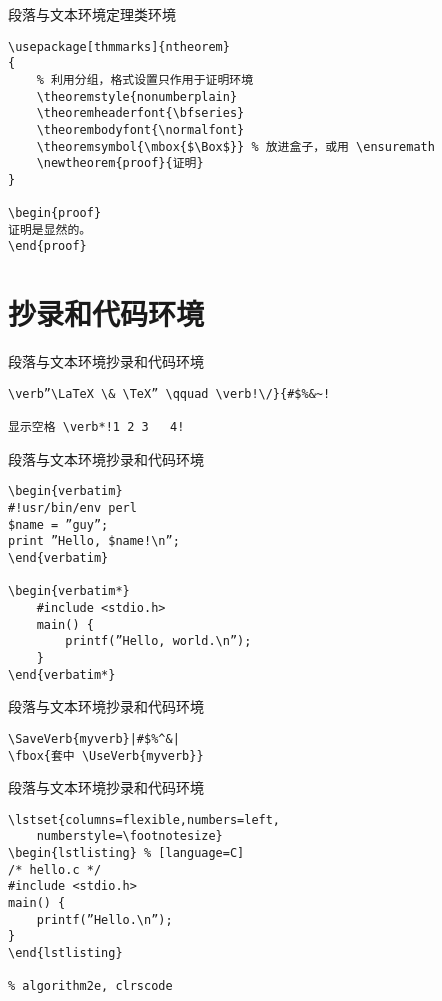 \documentclass[11pt]{beamer}
\begin{document}
\begin{frame}[fragile]{段落与文本环境}{定理类环境}
	\begin{Verbatim}[tabsize=2]
% 导言区
\usepackage[thmmarks]{ntheorem}
{
	% 利用分组，格式设置只作用于证明环境
	\theoremstyle{nonumberplain}
	\theoremheaderfont{\bfseries}
	\theorembodyfont{\normalfont}
	\theoremsymbol{\mbox{$\Box$}} % 放进盒子，或用 \ensuremath
	\newtheorem{proof}{证明}
}

\begin{proof}
证明是显然的。
\end{proof}
	\end{Verbatim}
\end{frame}

\section{抄录和代码环境}

\begin{frame}[fragile]{段落与文本环境}{抄录和代码环境}
	\begin{Verbatim}[tabsize=2]
\verb”\LaTeX \& \TeX” \qquad \verb!\/}{#$%&~!

显示空格 \verb*!1 2 3   4!
	\end{Verbatim}
\end{frame}

\begin{frame}[fragile]{段落与文本环境}{抄录和代码环境}
	\begin{Verbatim}[tabsize=2]
\begin{verbatim}
#!usr/bin/env perl
$name = ”guy”;
print ”Hello, $name!\n”;
\end{verbatim}

\begin{verbatim*}
	#include <stdio.h>
	main() {
		printf(”Hello, world.\n”);
	}
\end{verbatim*}
	\end{Verbatim}
\end{frame}

\begin{frame}[fragile]{段落与文本环境}{抄录和代码环境}
	\begin{Verbatim}[tabsize=2]
% \usepackage{fancyvrb}
\SaveVerb{myverb}|#$%^&|
\fbox{套中 \UseVerb{myverb}}
	\end{Verbatim}
\end{frame}

\begin{frame}[fragile]{段落与文本环境}{抄录和代码环境}
	\begin{Verbatim}[tabsize=2]
% 导言区使用 \usepackage{listings}
\lstset{columns=flexible,numbers=left,
	numberstyle=\footnotesize}
\begin{lstlisting} % [language=C]
/* hello.c */
#include <stdio.h>
main() {
	printf(”Hello.\n”);
}
\end{lstlisting} 

% algorithm2e, clrscode
	\end{Verbatim}
\end{frame}
\end{document}
